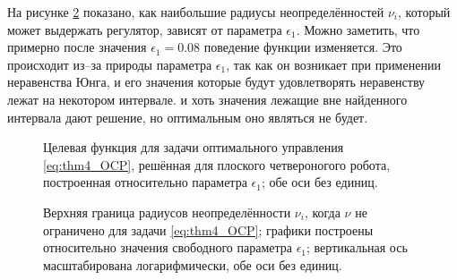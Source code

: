 На рисунке \ref{fig:mult_soft_nu} показано, как наибольшие радиусы неопределённостей $\nu_i$, который может выдержать регулятор, зависят от параметра $\epsilon_1$. Можно заметить, что примерно после значения $\epsilon_1 = 0.08$ поведение функции изменяется. Это происходит из--за природы параметра $\epsilon_1$, так как он возникает при применении неравенства Юнга, и его значения которые будут удовлетворять неравенству лежат на некотором интервале. и хоть значения лежащие вне найденного интервала дают решение, но оптимальным оно являться не будет. 

\begin{figure}[ht]
	\caption{Целевая функция для задачи оптимального управления \eqref{eq:thm4_OCP}, решённая для плоского четвероногого робота, построенная относительно параметра $\epsilon_1$; обе оси без единиц.} \label{fig:mult_soft_lin_cost}
\end{figure} 

\begin{figure}[ht]
	\caption{Верхняя граница радиусов неопределённости $\nu_i$, когда $\nu$ не ограничено для задачи \eqref{eq:thm4_OCP}; графики построены относительно значения свободного параметра $\epsilon_1$; вертикальная ось масштабирована логарифмически, обе оси без единиц.}\label{fig:mult_soft_nu}
\end{figure} 

